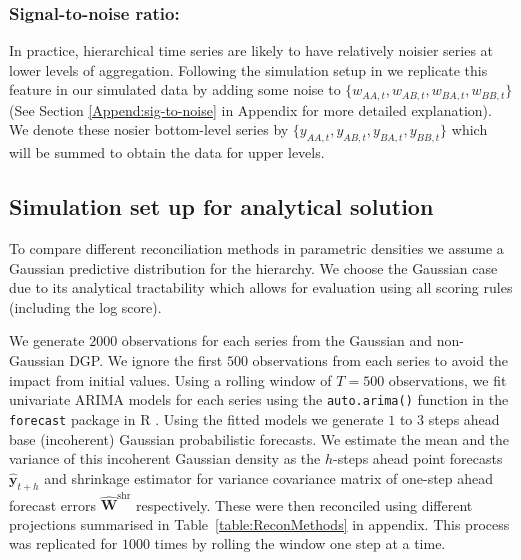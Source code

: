 \documentclass[12pt]{article}
\theoremstyle{definition}
\begin{document}
%

\subsubsection*{Signal-to-noise ratio:}

In practice, hierarchical time series are likely to have relatively noisier series at lower levels of aggregation. Following the simulation setup in \citet{WicEtAl2019} we replicate this feature in our simulated data by adding some noise to $\{w_{AA,t},w_{AB,t},w_{BA,t},w_{BB,t}\}$ (See Section \ref{Append:sig-to-noise} in Appendix for more detailed explanation). We denote these nosier bottom-level series by $\{y_{AA,t},y_{AB,t},y_{BA,t},y_{BB,t}\}$ which will be summed to obtain the data for upper levels. 


\subsection{Simulation set up for analytical solution}

To compare different reconciliation methods in parametric densities we assume a Gaussian predictive distribution for the hierarchy. We choose the Gaussian case due to its analytical tractability which allows for evaluation using all scoring rules (including the log score).

We generate $2000$ observations for each series from the Gaussian and non-Gaussian DGP. We ignore the first $500$ observations from each series to avoid the impact from initial values. Using a rolling window of $T=500$ observations, we fit univariate ARIMA models for each series using the \verb|auto.arima()| function in the \verb|forecast| package \citep{Rforecast} in R \citep{Rcore}. Using the fitted models we generate $1$ to $3$ steps ahead base (incoherent) Gaussian probabilistic forecasts. We estimate the mean and the variance of this incoherent Gaussian density as the $h$-steps ahead point forecasts $\hat{\bm{y}}_{t+h}$ and shrinkage estimator for variance covariance matrix of one-step ahead forecast errors $\hat{\bm{W}}^{\text{shr}}$ respectively. These were then reconciled using different projections summarised in Table~\ref{table:ReconMethods} in appendix. This process was replicated for $1000$ times by rolling the window one step at a time.
\end{document}
